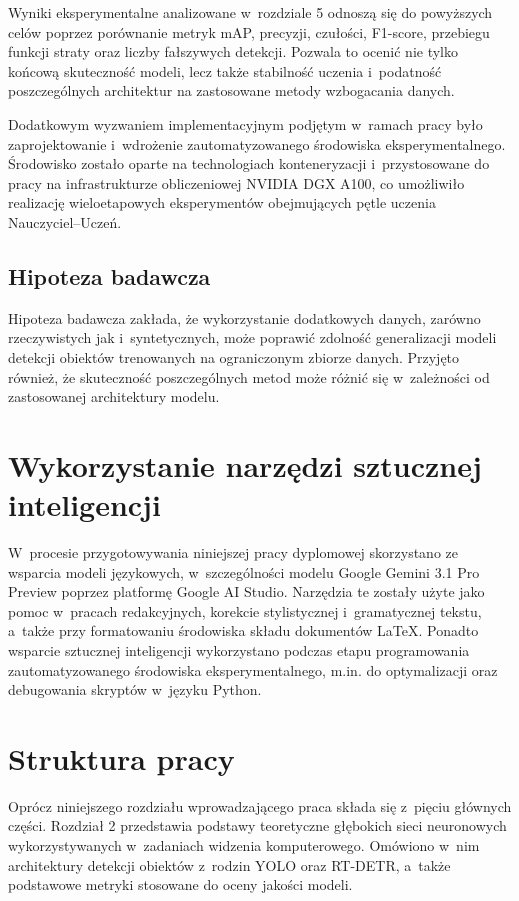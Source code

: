 Wyniki eksperymentalne analizowane w~rozdziale 5 odnoszą się do powyższych celów poprzez porównanie metryk mAP, precyzji, czułości, F1-score, przebiegu funkcji straty oraz liczby fałszywych detekcji. Pozwala to ocenić nie tylko końcową skuteczność modeli, lecz także stabilność uczenia i~podatność poszczególnych architektur na zastosowane metody wzbogacania danych.

Dodatkowym wyzwaniem implementacyjnym podjętym w~ramach pracy było zaprojektowanie i~wdrożenie zautomatyzowanego środowiska eksperymentalnego. Środowisko zostało oparte na technologiach konteneryzacji i~przystosowane do pracy na infrastrukturze obliczeniowej NVIDIA DGX A100, co umożliwiło realizację wieloetapowych eksperymentów obejmujących pętle uczenia Nauczyciel--Uczeń.

\subsection{Hipoteza badawcza}

Hipoteza badawcza zakłada, że wykorzystanie dodatkowych danych, zarówno rzeczywistych jak i~syntetycznych, może poprawić zdolność generalizacji modeli detekcji obiektów trenowanych na ograniczonym zbiorze danych. Przyjęto również, że skuteczność poszczególnych metod może różnić się w~zależności od zastosowanej architektury modelu.

\section{Wykorzystanie narzędzi sztucznej inteligencji}

W~procesie przygotowywania niniejszej pracy dyplomowej skorzystano ze wsparcia modeli językowych, w~szczególności modelu Google Gemini 3.1 Pro Preview poprzez platformę Google AI Studio. Narzędzia te zostały użyte jako pomoc w~pracach redakcyjnych, korekcie stylistycznej i~gramatycznej tekstu, a~także przy formatowaniu środowiska składu dokumentów \LaTeX. Ponadto wsparcie sztucznej inteligencji wykorzystano podczas etapu programowania zautomatyzowanego środowiska eksperymentalnego, m.in. do optymalizacji oraz debugowania skryptów w~języku Python.

\section{Struktura pracy}

Oprócz niniejszego rozdziału wprowadzającego praca składa się z~pięciu głównych części. Rozdział 2 przedstawia podstawy teoretyczne głębokich sieci neuronowych wykorzystywanych w~zadaniach widzenia komputerowego. Omówiono w~nim architektury detekcji obiektów z~rodzin YOLO oraz RT-DETR, a~także podstawowe metryki stosowane do oceny jakości modeli.


